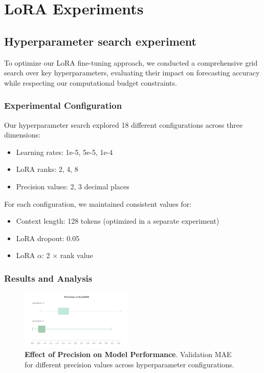 \documentclass{article}
\begin{document}
\section*{LoRA Experiments}
\subsection*{Hyperparameter search experiment}
To optimize our LoRA fine-tuning approach, we conducted a comprehensive grid search over key hyperparameters, evaluating their impact on forecasting accuracy while respecting our computational budget constraints.

\subsubsection*{Experimental Configuration}
Our hyperparameter search explored 18 different configurations across three dimensions:
\begin{itemize}
    \item Learning rates: 1e-5, 5e-5, 1e-4
    \item LoRA ranks: 2, 4, 8
    \item Precision values: 2, 3 decimal places
\end{itemize}

For each configuration, we maintained consistent values for:
\begin{itemize}
    \item Context length: 128 tokens (optimized in a separate experiment)
    \item LoRA dropout: 0.05
    \item LoRA $\alpha$: 2 $\times$ rank value
\end{itemize}
\subsubsection*{Results and Analysis}
\begin{figure}[h]
    \centering
    \includegraphics[width=0.48\textwidth]{precision}
    \caption{\textbf{Effect of Precision on Model Performance}. Validation MAE for different precision values across hyperparameter configurations.}
    \label{fig:hp_precision}
\end{figure}
\end{document}
